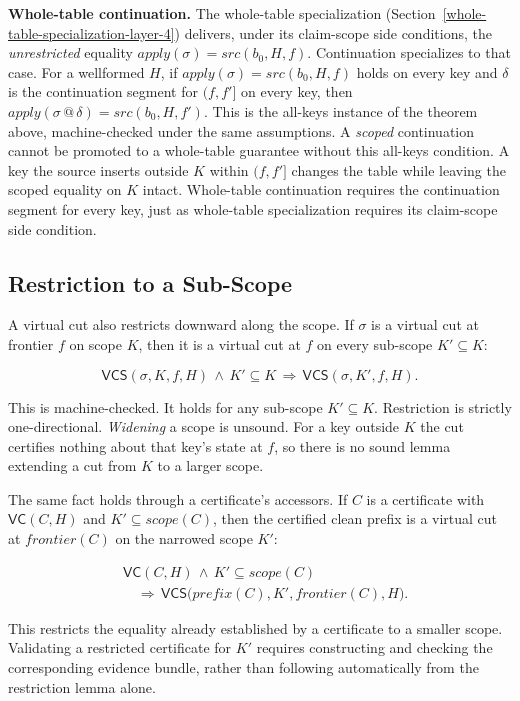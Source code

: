 \documentclass[letterpaper,10pt,twocolumn]{article}
\newcommand{\Apply}{\mathit{apply}}
\newcommand{\Src}{\mathit{src}}
\newcommand{\Scope}{\mathit{scope}}
\newcommand{\Frontier}{\mathit{frontier}}
\newcommand{\CleanPrefix}{\mathit{prefix}}
\newcommand{\VC}{\mathsf{VC}}
\newcommand{\VCS}{\mathsf{VCS}}
\begin{document}
\smallskip
\noindent\textbf{Whole-table continuation.} The whole-table
specialization (Section~\ref{whole-table-specialization-layer-4})
delivers, under its claim-scope side conditions, the \emph{unrestricted}
equality $\Apply(\sigma) = \Src(b_0,H,f)$. Continuation specializes to
that case. For a wellformed $H$, if $\Apply(\sigma) = \Src(b_0,H,f)$
holds on every key and $\delta$ is the continuation segment for
$(f,f']$ on every key, then
$\Apply(\sigma \mathbin{@} \delta) = \Src(b_0,H,f')$. This is the
all-keys instance of the theorem above, machine-checked under the same
assumptions. A \emph{scoped} continuation cannot be promoted to a
whole-table guarantee without this all-keys condition. A key the source
inserts outside $K$ within $(f,f']$ changes the table while leaving the
scoped equality on $K$ intact. Whole-table continuation requires the
continuation segment for every key, just as whole-table specialization
requires its claim-scope side condition.

\subsection{Restriction to a
Sub-Scope}\label{restriction-to-a-sub-scope}

A virtual cut also restricts downward along the scope. If $\sigma$ is a
virtual cut at frontier $f$ on scope $K$, then it is a virtual cut at
$f$ on every sub-scope $K' \subseteq K$:

\[
\VCS(\sigma,K,f,H) \,\land\, K' \subseteq K
  \,\Longrightarrow\, \VCS(\sigma,K',f,H).
\]

This is machine-checked. It holds for any sub-scope $K' \subseteq K$.
Restriction is strictly one-directional. \emph{Widening} a scope is
unsound. For a key outside $K$ the cut certifies nothing about that
key's state at $f$, so there is no sound lemma extending a cut from $K$
to a larger scope.

The same fact holds through a certificate's accessors. If $C$ is a
certificate with $\VC(C,H)$ and $K' \subseteq \Scope(C)$, then the
certified clean prefix is a virtual cut at $\Frontier(C)$ on the
narrowed scope $K'$:

\[
\begin{aligned}
&\VC(C,H) \,\land\, K' \subseteq \Scope(C)\\
&\quad\Longrightarrow\,
  \VCS\bigl(\CleanPrefix(C),K',\Frontier(C),H\bigr).
\end{aligned}
\]

This restricts the equality already established by a certificate to a
smaller scope. Validating a restricted certificate for $K'$ requires
constructing and checking the corresponding evidence bundle, rather than
following automatically from the restriction lemma alone.
\end{document}

